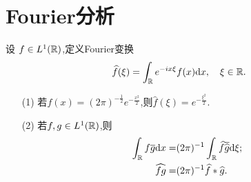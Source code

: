 \section{Fourier分析}
\begin{exercise}
  设 $f\in L^{1}(\mathbb{R})$,定义Fourier变换
  \[
    \widehat{f}(\xi)=\int_{\mathbb{R}}e^{-ix\xi}f(x)\mathrm{d}x,\quad \xi \in \mathbb{R}.
  \] 
  \begin{enumerate}
    \item [(1)]若$f(x)=(2\pi)^{-\frac{1}{2}}e^{- \frac{x^2}{2}}$,则$\widehat{f}(\xi)=e^{-\frac{\xi^2}{2}}$.
    \item [(2)]若$f,g\in L^{1}(\mathbb{R})$,则
      \begin{align*}
	\int_{\mathbb{R}}f\overline{g}\mathrm{d}x=&(2\pi)^{-1}\int_{\mathbb{R}}\widehat{f}\overline{\widehat{g}}\mathrm{d}\xi;\\
	\widehat{fg}=&(2\pi)^{-1}\widehat{f}* \widehat{g}.
      \end{align*}
  \end{enumerate}
\end{exercise}
